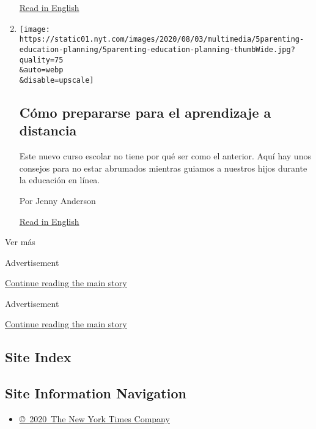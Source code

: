 \begin{enumerate}
  \href{https://www.nytimes.com/2020/08/12/science/frog-group-fidelity.html}{Read
  in English}
\item
  \href{/es/2020/08/12/espanol/curso-escolar-en-linea.html}{}

  \texttt{[image: https://static01.nyt.com/images/2020/08/03/multimedia/5parenting-education-planning/5parenting-education-planning-thumbWide.jpg?quality=75\\\&auto=webp\\\&disable=upscale]}

  \hypertarget{cuxf3mo-prepararse-para-el-aprendizaje-a-distancia}{%
  \subsection{Cómo prepararse para el aprendizaje a
  distancia}\label{cuxf3mo-prepararse-para-el-aprendizaje-a-distancia}}

  Este nuevo curso escolar no tiene por qué ser como el anterior. Aquí
  hay unos consejos para no estar abrumados mientras guiamos a nuestros
  hijos durante la educación en línea.

  Por Jenny Anderson

  \href{https://www.nytimes.com/2020/08/05/parenting/parents-distance-learning.html}{Read
  in English}
\end{enumerate}

Ver más

Advertisement

\protect\hyperlink{after-mid3}{Continue reading the main story}

Advertisement

\protect\hyperlink{after-mktg}{Continue reading the main story}

\hypertarget{site-index}{%
\subsection{Site Index}\label{site-index}}

\hypertarget{site-information-navigation}{%
\subsection{Site Information
Navigation}\label{site-information-navigation}}

\begin{itemize}
\tightlist
\item
  \href{https://help.nytimes.com/hc/en-us/articles/115014792127-Copyright-notice}{©~2020~The
  New York Times Company}
\end{itemize}

